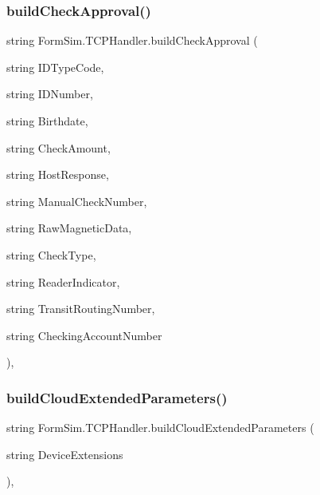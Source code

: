 \subsubsection{\texorpdfstring{build\+Check\+Approval()}{buildCheckApproval()}}
{\footnotesize\ttfamily string Form\+Sim.\+T\+C\+P\+Handler.\+build\+Check\+Approval (\begin{DoxyParamCaption}\item[{string}]{I\+D\+Type\+Code,  }\item[{string}]{I\+D\+Number,  }\item[{string}]{Birthdate,  }\item[{string}]{Check\+Amount,  }\item[{string}]{Host\+Response,  }\item[{string}]{Manual\+Check\+Number,  }\item[{string}]{Raw\+Magnetic\+Data,  }\item[{string}]{Check\+Type,  }\item[{string}]{Reader\+Indicator,  }\item[{string}]{Transit\+Routing\+Number,  }\item[{string}]{Checking\+Account\+Number }\end{DoxyParamCaption})\hspace{0.3cm}{\ttfamily [inline]}, {\ttfamily [private]}}

\mbox{\label{class_form_sim_1_1_t_c_p_handler_aae852cd3817353f951a7473471a1b9de}} 
\subsubsection{\texorpdfstring{build\+Cloud\+Extended\+Parameters()}{buildCloudExtendedParameters()}}
{\footnotesize\ttfamily string Form\+Sim.\+T\+C\+P\+Handler.\+build\+Cloud\+Extended\+Parameters (\begin{DoxyParamCaption}\item[{string}]{Device\+Extensions }\end{DoxyParamCaption})\hspace{0.3cm}{\ttfamily [inline]}, {\ttfamily [private]}}

\mbox{\label{class_form_sim_1_1_t_c_p_handler_a7800a9d1eff8e2f38f22a8e4aebfed72}} 
